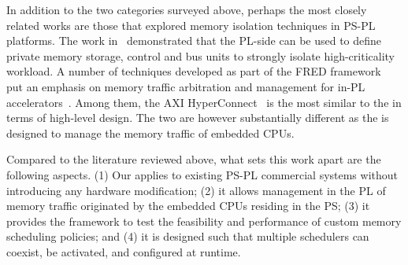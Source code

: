In addition to the two categories surveyed above, perhaps the most
closely related works are those that explored memory isolation
techniques in PS-PL platforms. The work in~\cite{pspl_mixcrit}
demonstrated that the PL-side can be used to define private memory
storage, control and bus units to strongly isolate high-criticality
workload. A number of techniques developed as part of the FRED
framework~\cite{fred_ssup} put an emphasis on memory traffic
arbitration and management for in-PL
accelerators~\cite{fred_hyperconnect, fred_abu, fred_abe}. Among them,
the AXI HyperConnect~\cite{fred_hyperconnect} is the most similar to
the \schim in terms of high-level design. The two are however
substantially different as the \schim is designed to manage the memory
traffic of embedded CPUs.

Compared to the literature reviewed above, what sets this work apart
are the following aspects. (1) Our \schim applies to existing PS-PL
commercial systems without introducing any hardware modification; (2)
it allows management in the PL of memory traffic originated by the
embedded CPUs residing in the PS; (3) it provides the framework to
test the feasibility and performance of custom memory scheduling
policies; and (4) it is designed such that multiple schedulers can
coexist, be activated, and configured at runtime.



